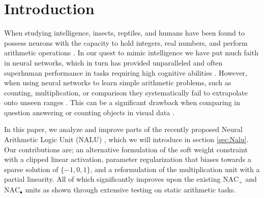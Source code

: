 \section{Introduction}
When studying intelligence, insects, reptiles, and humans have been found to possess neurons with the capacity to hold integers, real numbers, and perform arithmetic operations \cite{nieder-neuronal-number,rugani-arithmetic-chicks,gallistel-numbers-in-brain}.
In our quest to mimic intelligence we have put much faith in neural networks, which in turn has provided unparalleled and often superhuman performance in tasks requiring high cognitive abilities \cite{natureGo,googleNMT,resnet}.
However, when using neural networks to learn simple arithmetic problems, such as counting, multiplication, or comparison they systematically fail to extrapolate onto unseen ranges \cite{stillNotSystematic,suzgun2019evaluating,trask-nalu}. This can be a significant drawback when comparing in question answering \cite{naturalquestions} or counting objects in visual data \cite{johnson2017clevr,drewspaper}.

In this paper, we analyze and improve parts of the recently proposed Neural Arithmetic Logic Unit (NALU) \cite{trask-nalu}, which we will introduce in section \ref{sec:Nalu}. Our contributions are; an alternative formulation of the soft weight constraint with a clipped linear activation, parameter regularization that biases towards a sparse solution of $\{-1,0,1\}$, and a reformulation of the multiplication unit with a partial linearity. All of which significantly improves upon the existing $\text{NAC}_{+}$ and $\text{NAC}_{\bullet}$ units as shown through extensive testing on static arithmetic tasks.

